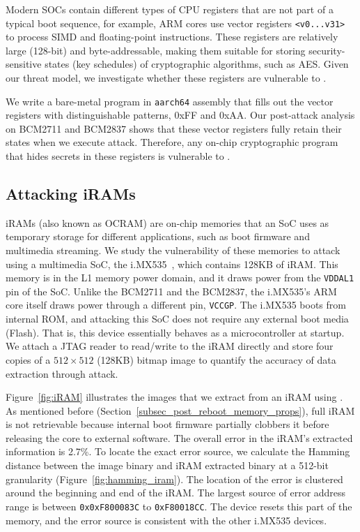 Modern SOCs contain different types of CPU registers that are not part of a typical boot sequence, for example, ARM cores use vector registers \texttt{<v0...v31>} to process SIMD and floating-point instructions. 
These registers are relatively large (128-bit) and byte-addressable, making them suitable for storing security-sensitive states (\eg key schedules) of cryptographic algorithms, such as AES.
Given our threat model, we investigate whether these registers are vulnerable to \sys{}.

We write a bare-metal program in \texttt{aarch64} assembly that fills out the vector registers with distinguishable patterns, \eg 0xFF and 0xAA. 
Our post-attack analysis on BCM2711 and BCM2837 shows that these vector registers fully retain their states when we execute \sys{} attack.
Therefore, any on-chip cryptographic program that hides secrets in these registers is vulnerable to \sys{}.

\subsection{Attacking iRAMs}
\label{sub_sec_irams}

iRAMs (also known as OCRAM) are on-chip memories that an SoC uses as temporary storage for different applications, such as boot firmware and multimedia streaming. 
We study the vulnerability of these memories to \sys{} attack using a multimedia SoC, the i.MX535~\cite{imx535}, which contains 128KB of iRAM. 
This memory is in the L1 memory power domain, and it draws power from the \texttt{VDDAL1} pin of the SoC.
Unlike the BCM2711 and the BCM2837, the i.MX535's ARM core itself draws power through a different pin, \texttt{VCCGP}. 
The i.MX535 boots from internal ROM, and attacking this SoC does not require any external boot media (\eg Flash). 
That is, this device essentially behaves as a microcontroller at startup. 
We attach a JTAG reader to read/write to the iRAM directly and store four copies of a $512\times512$ (128KB) bitmap image to quantify the accuracy of data extraction through \sys{} attack.  

Figure~\ref{fig:iRAM} illustrates the images that we extract from an iRAM using \sys{}. 
As mentioned before (Section~\ref{subsec_post_reboot_memory_props}), full iRAM is not retrievable because internal boot firmware partially clobbers it before releasing the core to external software. 
The overall error in the iRAM's extracted information is 2.7\%.
To locate the exact error source, we calculate the Hamming distance between the image binary and iRAM extracted binary at a 512-bit granularity (Figure~\ref{fig:hamming_iram}). 
The location of the error is clustered around the beginning and end of the iRAM. The largest source of error address range is between \lstinline{0x0xF800083C} to \lstinline{0xF80018CC}.
The device resets this part of the memory, and the error source is consistent with the other i.MX535 devices.

